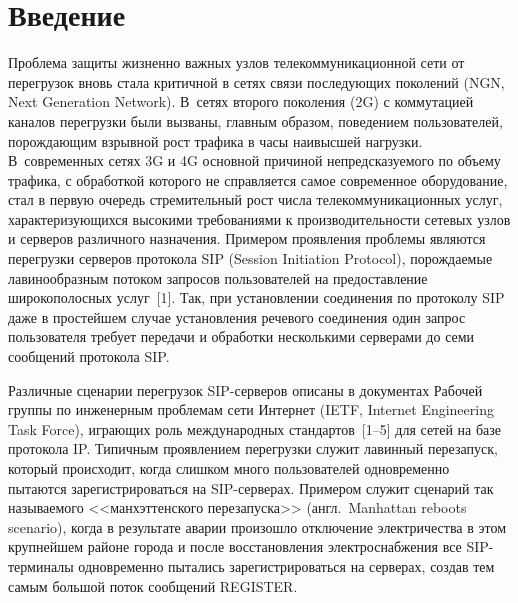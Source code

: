


      \thispagestyle{headings}

      \begin{multicols}{2}

            \label{st\stat}


\section{Введение}

Проблема защиты жизненно важных узлов телекоммуникационной сети от
перегрузок вновь стала критичной в сетях связи последующих поколений
(NGN, Next Generation Network). В~сетях второго поколения (2G) с
коммутацией каналов перегрузки были вызваны, главным образом,
поведением пользователей, порождающим взрывной рост трафика в часы
наивысшей нагрузки. В~современных сетях 3G и 4G основной причиной
непредсказуемого по объему трафика, с обработкой которого не
справляется самое современное оборудование, стал в первую очередь
стремительный рост числа телекоммуникационных услуг,
характеризующихся высокими требованиями к производительности сетевых
узлов и серверов различного назначения. Примером проявления проблемы
являются перегрузки серверов протокола SIP (Session Initiation
Protocol), порождаемые лавинообразным потоком запросов пользователей
на предоставление широкополосных услуг~[1]. Так, при установлении
соединения по протоколу SIP даже в простейшем случае установления
речевого соединения один запрос пользователя требует передачи и
обработки несколькими серверами до семи сообщений протокола SIP.

Различные сценарии перегрузок SIP-сер\-ве\-ров описаны в документах
Рабочей группы по инженерным проблемам сети Интернет (IETF, Internet
Engineering Task Force), играющих роль международных стандартов~[1--5] 
для сетей на базе протокола IP. Типичным проявлением
перегрузки служит лавинный перезапуск, который происходит, когда
слишком много пользователей одновременно пытаются зарегистрироваться
на SIP-сер\-ве\-рах. Примером служит сценарий так называемого
<<манхэттенского перезапуска>> (англ.\ Manhattan reboots scenario),
когда в результате аварии произошло отключение электричества в этом
крупнейшем районе города и после восстановления электроснабжения все
SIP-тер\-ми\-на\-лы одновременно пытались зарегистрироваться на серверах,
создав тем самым большой поток сообщений REGISTER.


\end{multicols}
